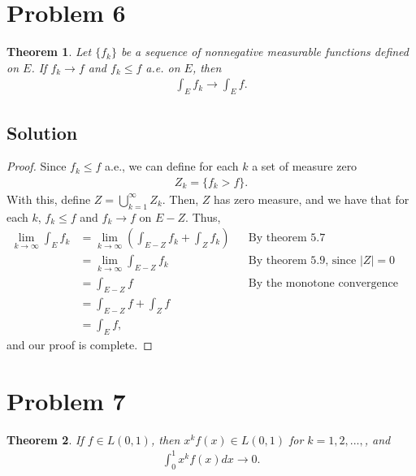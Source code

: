\documentclass[10pt,a4paper]{article}
\theoremstyle{theorem}
\newtheorem{theorem}{Theorem}
\theoremstyle{definition}
\begin{document}
\section*{Problem 6}
\begin{theorem}
Let $\{f_k \}$ be a sequence of nonnegative measurable functions defined on $E$. If $f_k \to f$ and $f_k \leq f$ a.e. on $E$, then 
\begin{align*}
\int_E f_k \to \int_E f.
\end{align*}
\end{theorem}

\subsection*{Solution}
\begin{proof}
Since $f_k \leq f$ a.e., we can define for each $k$ a set of measure zero
\begin{align*}
Z_k = \{f_k > f \}.
\end{align*}
With this, define $Z = \bigcup_{k=1}^\infty Z_k$. Then, $Z$ has zero measure, and we have that for each $k$, $f_k \leq f$ and $f_k \to f$ on $E - Z$. Thus,
\begin{align*}
\lim_{k \to \infty} \int_E f_k &= \lim_{k \to \infty} \left(\int_{E - Z} f_k + \int_Z f_k \right) && \text{By theorem 5.7}\\
&= \lim_{k \to \infty} \int_{E - Z} f_k &&\text{By theorem 5.9, since } |Z| = 0\\
&= \int_{E - Z} f &&\text{By the monotone convergence theorem}\\
&= \int_{E - Z} f + \int_{Z} f\\
&= \int_{E} f,
\end{align*}
and our proof is complete.
\end{proof}

\section*{Problem 7}
\begin{theorem}
If $f \in L(0, 1)$, then $x^k f(x) \in L(0, 1)$ for $k = 1,2,...,$, and 
\begin{align*}
\int_0^1 x^k f(x) dx \to 0.
\end{align*}
\end{theorem}
\end{document}
